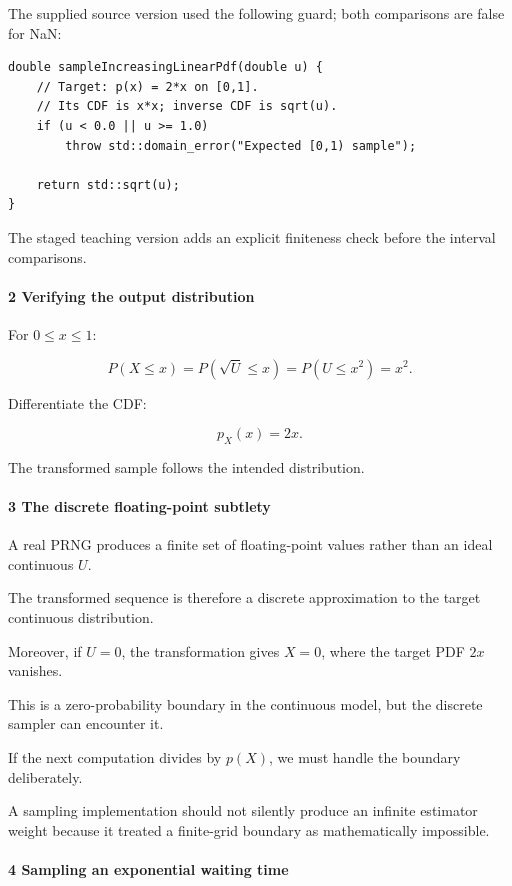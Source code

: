 The supplied source version used the following guard; both comparisons are false for NaN:

\begin{verbatim}
double sampleIncreasingLinearPdf(double u) {
    // Target: p(x) = 2*x on [0,1].
    // Its CDF is x*x; inverse CDF is sqrt(u).
    if (u < 0.0 || u >= 1.0)
        throw std::domain_error("Expected [0,1) sample");

    return std::sqrt(u);
}
\end{verbatim}

The staged teaching version adds an explicit finiteness check before the interval comparisons.

\paragraph{2 Verifying the output distribution}\label{verifying-the-output-distribution}

For \(0\le x\le1\):

\[
 P(X\le x) = P(\sqrt U\le x) = P(U\le x^2) =x^2.
\]

Differentiate the CDF:

\[
 p_X(x)=2x.
\]

The transformed sample follows the intended distribution.

\paragraph{3 The discrete floating-point subtlety}\label{the-discrete-floating-point-subtlety}

A real PRNG produces a finite set of floating-point values rather than an ideal continuous \(U\).

The transformed sequence is therefore a discrete approximation to the target continuous distribution.

Moreover, if \(U=0\), the transformation gives \(X=0\), where the target PDF \(2x\) vanishes.

This is a zero-probability boundary in the continuous model, but the discrete sampler can encounter it.

If the next computation divides by \(p(X)\), we must handle the boundary deliberately.

A sampling implementation should not silently produce an infinite estimator weight because it treated a finite-grid boundary as mathematically impossible.

\paragraph{4 Sampling an exponential waiting time}\label{sampling-an-exponential-waiting-time}


